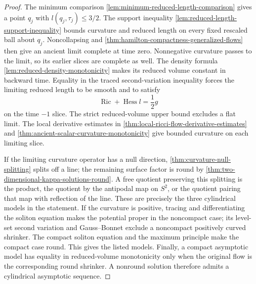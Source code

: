 \begin{proof}
The minimum comparison \ref{lem:minimum-reduced-length-comparison} gives a
point $q_j$ with $l(q_j,\tau_j)\le3/2$.  The support inequality
\ref{lem:reduced-length-support-inequality} bounds curvature and reduced
length on every fixed rescaled ball about $q_j$.  Noncollapsing and
\ref{thm:hamilton-compactness-generalized-flows} then give an ancient limit
complete at time zero.  Nonnegative curvature passes to the limit, so its
earlier slices are complete as well.  The density formula
\ref{lem:reduced-density-monotonicity} makes its
reduced volume constant in backward time.  Equality in the traced
second-variation inequality forces
the limiting reduced length to be smooth and to satisfy
\[
 \operatorname{Ric}+\operatorname{Hess}l=\frac12g
\]
on the time $-1$ slice.  The strict reduced-volume upper bound excludes a
flat limit.  The local derivative estimates in
\ref{thm:local-ricci-flow-derivative-estimates} and
\ref{thm:ancient-scalar-curvature-monotonicity} give bounded curvature on
each limiting slice.

If the limiting curvature operator has a null direction,
\ref{thm:curvature-null-splitting} splits off a line; the remaining surface
factor is round by \ref{thm:two-dimensional-kappa-solutions-round}.  A free
quotient preserving this splitting is the product, the quotient by the
antipodal map on $S^2$, or the quotient pairing that map with reflection of
the line.  These are precisely the three cylindrical models in the
statement.  If the curvature is positive, tracing and differentiating the soliton equation makes
the potential proper in the noncompact case; its level-set second variation
and Gauss--Bonnet exclude a noncompact positively curved shrinker.  The
compact soliton equation and the maximum principle make the compact case
round.  This gives the listed models.  Finally, a compact asymptotic model
has equality in reduced-volume monotonicity only when the original flow is
the corresponding round shrinker.  A nonround solution therefore admits a
cylindrical asymptotic sequence.
\end{proof}

